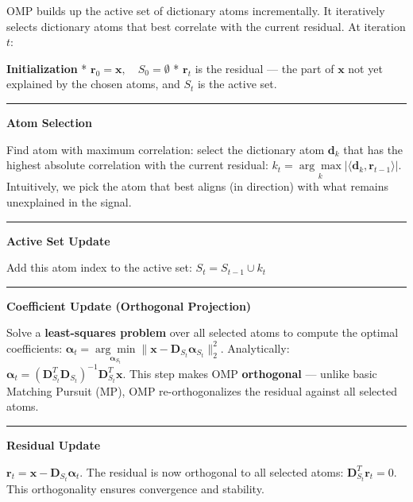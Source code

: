 \documentclass[11pt]{article}
\begin{document}
OMP builds up the active set of dictionary atoms incrementally. It
iteratively selects dictionary atoms that best correlate with the
current residual. At iteration \(t\):

\textbf{Initialization} *
\(\mathbf{r}_0 = \mathbf{x}, \quad S_0 = \emptyset\) * \(\mathbf{r}_t\)
is the residual --- the part of \(\mathbf{x}\) not yet explained by the
chosen atoms, and \(S_t\) is the active set.

\begin{center}\rule{0.5\linewidth}{0.5pt}\end{center}

\textbf{Atom Selection}

Find atom with maximum correlation: select the dictionary atom
\(\mathbf{d}_k\) that has the highest absolute correlation with the
current residual:
\(k_t = \underset{k}{\arg\max} |\langle \mathbf{d}_k, \mathbf{r}_{t-1} \rangle|\).
Intuitively, we pick the atom that best aligns (in direction) with what
remains unexplained in the signal.

\begin{center}\rule{0.5\linewidth}{0.5pt}\end{center}

\textbf{Active Set Update}

Add this atom index to the active set: \(S_t = S_{t-1} \cup {k_t}\)

\begin{center}\rule{0.5\linewidth}{0.5pt}\end{center}

\textbf{Coefficient Update (Orthogonal Projection)}

Solve a \textbf{least-squares problem} over all selected atoms to
compute the optimal coefficients:
\(\boldsymbol{\alpha}_t = \underset{{\boldsymbol{\alpha}_{S_t}}}{\arg\min} \|\mathbf{x} - \mathbf{D}_{S_t}\boldsymbol{\alpha}_{S_t}\|_2^2\).
Analytically:
\(\boldsymbol{\alpha}_t = (\mathbf{D}_{S_t}^T\mathbf{D}_{S_t})^{-1}\mathbf{D}_{S_t}^T \mathbf{x}\).
This step makes OMP \textbf{orthogonal} --- unlike basic Matching
Pursuit (MP), OMP re-orthogonalizes the residual against all selected
atoms.

\begin{center}\rule{0.5\linewidth}{0.5pt}\end{center}

\textbf{Residual Update}

\(\mathbf{r}_t = \mathbf{x} - \mathbf{D}_{S_t}\boldsymbol{\alpha}_t\).
The residual is now orthogonal to all selected atoms:
\(\mathbf{D}_{S_t}^T \mathbf{r}_t = 0\). This orthogonality ensures
convergence and stability.
\end{document}
